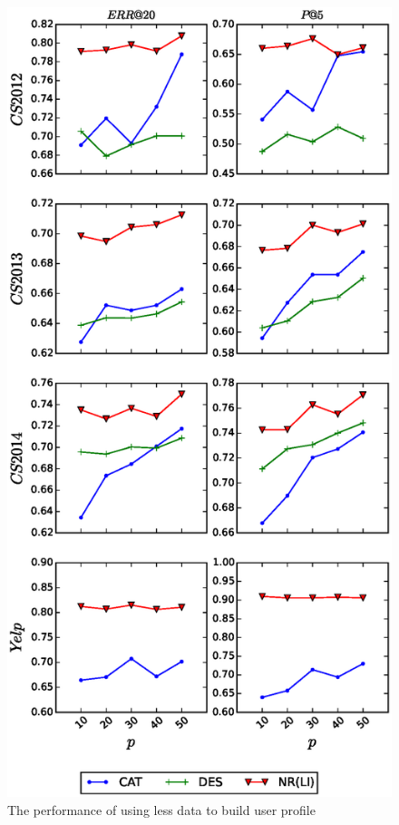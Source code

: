 \begin{figure}[t]
  \centering
  \includegraphics[scale=0.8]{figures/less-data-all.eps}
  \caption{The performance of using less data to build user profile}
  \label{fig:less_data_all}
\end{figure}




